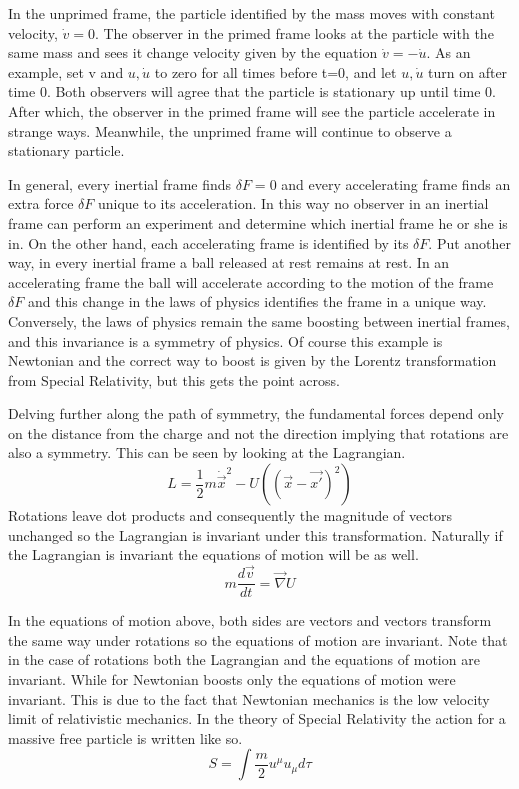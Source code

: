 In the unprimed frame, the particle identified by the mass moves with constant velocity, $\dot{v} = 0$. The observer in the primed frame looks at the particle with the same mass and sees it change velocity given by the equation $\dot{v} = -\dot{u}$. As an example, set v and $u, \dot{u}$ to zero for all times before t=0, and let $u, \dot{u}$ turn on after time 0. Both observers will agree that the particle is stationary up until time 0. After which, the observer in the primed frame will see the particle accelerate in strange ways. Meanwhile, the unprimed frame will continue to observe a stationary particle. 

In general, every inertial frame finds $\delta F = 0$ and every accelerating frame finds an extra force $\delta F$ unique to its acceleration. In this way no observer in an inertial frame can perform an experiment and determine which inertial frame he or she is in. On the other hand, each accelerating frame is identified by its $\delta F$.  Put another way, in every inertial frame a ball released at rest remains at rest. In an accelerating frame the ball will accelerate according to the motion of the frame $\delta F$ and this change in the laws of physics identifies the frame in a unique way. Conversely, the laws of physics remain the same boosting between inertial frames, and this invariance is a symmetry of physics. Of course this example is Newtonian and the correct way to boost is given by the Lorentz transformation from Special Relativity, but this gets the point across.

Delving further along the path of symmetry, the fundamental forces depend only on the distance from the charge and not the direction implying that rotations are also a symmetry. This can be seen by looking at the Lagrangian. 
\begin{equation}
L = \frac{1}{2} m\dot{\vec{x}}^2 - U((\vec{x} - \vec{x'})^2)
\end{equation}
Rotations leave dot products and consequently the magnitude of vectors unchanged so the Lagrangian is invariant under this transformation. Naturally if the Lagrangian is invariant the equations of motion will be as well.
\begin{equation}
m\frac{d\vec{v}}{dt} = \vec{\nabla} U
\end{equation}

In the equations of motion above, both sides are vectors and vectors transform the same way under rotations so the equations of motion are invariant. Note that in the case of rotations both the Lagrangian and the equations of motion are invariant. While for Newtonian boosts only the equations of motion were invariant. This is due to the fact that Newtonian mechanics is the low velocity limit of relativistic mechanics. In the theory of Special Relativity the action for a massive free particle is written like so.
\begin{equation}
S = \int \frac{m}{2}u^{\mu}u_{\mu}d\tau
\end{equation}

